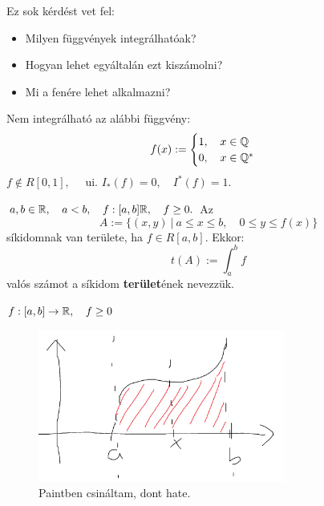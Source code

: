 \documentclass[a4paper,11.5pt]{article}
\begin{document}
	Ez sok kérdést vet fel:
	\begin{itemize}
		\item Milyen függvények integrálhatóak?
		\item Hogyan lehet egyáltalán ezt kiszámolni?
		\item Mi a fenére lehet alkalmazni?
	\end{itemize}
	\begin{example}
		Nem integrálható az alábbi függvény:
		\[ f(x):=
		\begin{cases}
			1,\quad x\in\mathbb{Q}\\
			0,\quad x\in \mathbb{Q}^*
		\end{cases} \]
		$f\notin R[0,1],\quad$ ui. $I_*(f)=0,\quad  I^*(f)=1.$
	\end{example}
	\begin{definition}
		$a,b\in\mathbb{R},\quad a<b,\quad f:[a,b]\mathbb{R},\quad f\geq 0.$ 
		Az
		\[ A:=\{ (x,y)\ | \ a\leq x\leq b,\quad 0\leq y\leq f(x) \} \]
		síkidomnak van területe, ha $f\in R[a,b]$. Ekkor:
		\[ t(A):=\int_a^bf \]
		valós számot a síkidom \textbf{terület}ének nevezzük.
	\end{definition}
	\begin{note}
		$f:[a,b]\to\mathbb{R},\quad f\geq 0$
		\begin{figure}[H]
			\centering
			\includegraphics[height=5cm]{kepek/terulet.png}
			\caption{Paintben csináltam, dont hate.}\label{}
		\end{figure}
	\end{note}
\end{document}
